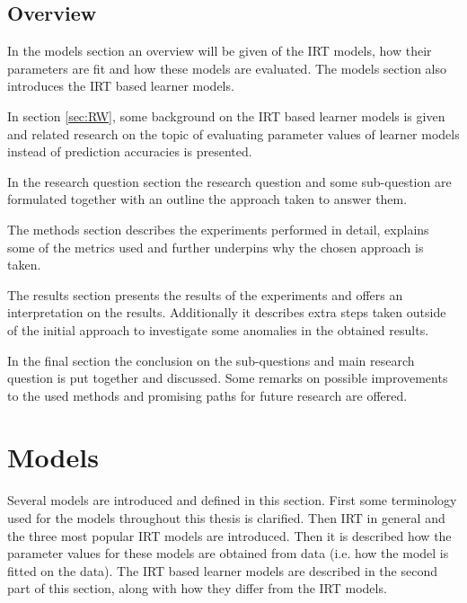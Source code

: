 \documentclass{scrartcl}
\begin{document}
\subsection{Overview}
In the models section an overview will be given of the IRT models, how their parameters are fit and how these models are evaluated. The models section also introduces the IRT based learner models.

In section \ref{sec:RW}, some background on the IRT based learner models is given and related research on the topic of evaluating parameter values of learner models instead of prediction accuracies is presented.

In the research question section the research question and some sub-question are formulated together with an outline the approach taken to answer them.

The methods section describes the experiments performed in detail, explains some of the metrics used and further underpins why the chosen approach is taken.

The results section presents the results of the experiments and offers an interpretation on the results. Additionally it describes extra steps taken outside of the initial approach to investigate some anomalies in the obtained results.

In the final section the conclusion on the sub-questions and main research question is put together and discussed. Some remarks on possible improvements to the used methods and promising paths for future research are offered.

\section{Models}
Several models are introduced and defined in this section. First some terminology used for the models throughout this thesis is clarified. Then IRT in general and the three most popular IRT models are introduced. Then it is described how the parameter values for these models are obtained from data (i.e. how the model is fitted on the data). The IRT based learner models are described in the second part of this section, along with how they differ from the IRT models.
\end{document}
